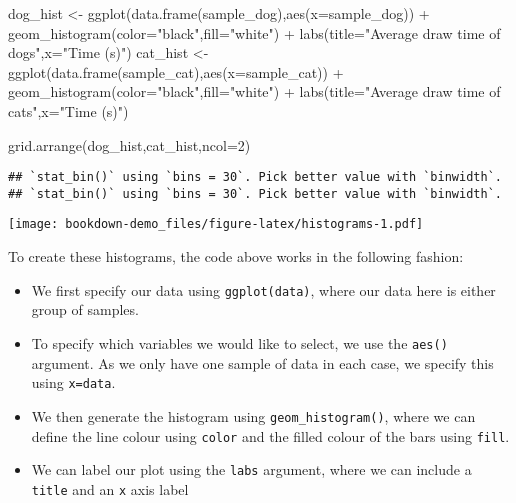 \documentclass[
]{book}
\newenvironment{Shaded}{\begin{snugshade}}{\end{snugshade}}
\newcommand{\AttributeTok}[1]{\textcolor[rgb]{0.77,0.63,0.00}{#1}}
\newcommand{\DecValTok}[1]{\textcolor[rgb]{0.00,0.00,0.81}{#1}}
\newcommand{\FunctionTok}[1]{\textcolor[rgb]{0.00,0.00,0.00}{#1}}
\newcommand{\NormalTok}[1]{#1}
\newcommand{\OtherTok}[1]{\textcolor[rgb]{0.56,0.35,0.01}{#1}}
\newcommand{\SpecialCharTok}[1]{\textcolor[rgb]{0.00,0.00,0.00}{#1}}
\newcommand{\StringTok}[1]{\textcolor[rgb]{0.31,0.60,0.02}{#1}}
\providecommand{\tightlist}{%
  \setlength{\itemsep}{0pt}\setlength{\parskip}{0pt}}
\begin{document}
\begin{Shaded}
\begin{Highlighting}[]
\NormalTok{dog\_hist }\OtherTok{\textless{}{-}} \FunctionTok{ggplot}\NormalTok{(}\FunctionTok{data.frame}\NormalTok{(sample\_dog),}\FunctionTok{aes}\NormalTok{(}\AttributeTok{x=}\NormalTok{sample\_dog)) }\SpecialCharTok{+} \FunctionTok{geom\_histogram}\NormalTok{(}\AttributeTok{color=}\StringTok{"black"}\NormalTok{,}\AttributeTok{fill=}\StringTok{"white"}\NormalTok{) }\SpecialCharTok{+} 
            \FunctionTok{labs}\NormalTok{(}\AttributeTok{title=}\StringTok{"Average draw time of dogs"}\NormalTok{,}\AttributeTok{x=}\StringTok{"Time (s)"}\NormalTok{)}
\NormalTok{cat\_hist }\OtherTok{\textless{}{-}} \FunctionTok{ggplot}\NormalTok{(}\FunctionTok{data.frame}\NormalTok{(sample\_cat),}\FunctionTok{aes}\NormalTok{(}\AttributeTok{x=}\NormalTok{sample\_cat)) }\SpecialCharTok{+} \FunctionTok{geom\_histogram}\NormalTok{(}\AttributeTok{color=}\StringTok{"black"}\NormalTok{,}\AttributeTok{fill=}\StringTok{"white"}\NormalTok{) }\SpecialCharTok{+} 
  \FunctionTok{labs}\NormalTok{(}\AttributeTok{title=}\StringTok{"Average draw time of cats"}\NormalTok{,}\AttributeTok{x=}\StringTok{"Time (s)"}\NormalTok{)}

\FunctionTok{grid.arrange}\NormalTok{(dog\_hist,cat\_hist,}\AttributeTok{ncol=}\DecValTok{2}\NormalTok{)}
\end{Highlighting}
\end{Shaded}

\begin{verbatim}
## `stat_bin()` using `bins = 30`. Pick better value with `binwidth`.
## `stat_bin()` using `bins = 30`. Pick better value with `binwidth`.
\end{verbatim}

\texttt{[image: bookdown-demo\_files/figure-latex/histograms-1.pdf]}

To create these histograms, the code above works in the following fashion:

\begin{itemize}
\tightlist
\item
  We first specify our data using \texttt{ggplot(data)}, where our data here is either group of samples.
\item
  To specify which variables we would like to select, we use the \texttt{aes()} argument. As we only have one sample of data in each case, we specify this using \texttt{x=data}.
\item
  We then generate the histogram using \texttt{geom\_histogram()}, where we can define the line colour using \texttt{color} and the filled colour of the bars using \texttt{fill}.
\item
  We can label our plot using the \texttt{labs} argument, where we can include a \texttt{title} and an \texttt{x} axis label
\end{itemize}
\end{document}
